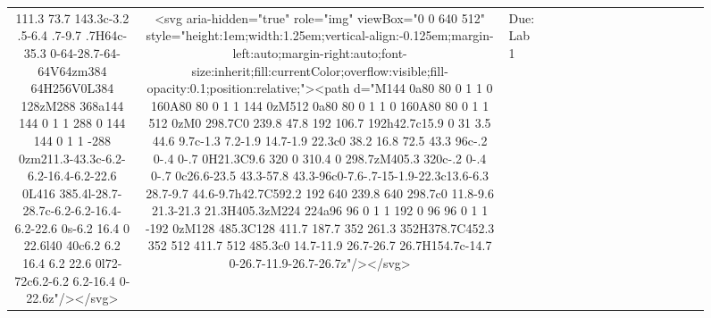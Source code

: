 \documentclass[
]{article}
\begin{document}
\begin{figure*}
\begin{longtable*}{cclllccccccccccl}
111.3 73.7 143.3c-3.2 .5-6.4 .7-9.7 .7H64c-35.3 0-64-28.7-64-64V64zm384 64H256V0L384 128zM288 368a144 144 0 1 1 288 0 144 144 0 1 1 -288 0zm211.3-43.3c-6.2-6.2-16.4-6.2-22.6 0L416 385.4l-28.7-28.7c-6.2-6.2-16.4-6.2-22.6 0s-6.2 16.4 0 22.6l40 40c6.2 6.2 16.4 6.2 22.6 0l72-72c6.2-6.2 6.2-16.4 0-22.6z"/></svg> & <svg aria-hidden="true" role="img" viewBox="0 0 640 512" style="height:1em;width:1.25em;vertical-align:-0.125em;margin-left:auto;margin-right:auto;font-size:inherit;fill:currentColor;overflow:visible;fill-opacity:0.1;position:relative;"><path d="M144 0a80 80 0 1 1 0 160A80 80 0 1 1 144 0zM512 0a80 80 0 1 1 0 160A80 80 0 1 1 512 0zM0 298.7C0 239.8 47.8 192 106.7 192h42.7c15.9 0 31 3.5 44.6 9.7c-1.3 7.2-1.9 14.7-1.9 22.3c0 38.2 16.8 72.5 43.3 96c-.2 0-.4 0-.7 0H21.3C9.6 320 0 310.4 0 298.7zM405.3 320c-.2 0-.4 0-.7 0c26.6-23.5 43.3-57.8 43.3-96c0-7.6-.7-15-1.9-22.3c13.6-6.3 28.7-9.7 44.6-9.7h42.7C592.2 192 640 239.8 640 298.7c0 11.8-9.6 21.3-21.3 21.3H405.3zM224 224a96 96 0 1 1 192 0 96 96 0 1 1 -192 0zM128 485.3C128 411.7 187.7 352 261.3 352H378.7C452.3 352 512 411.7 512 485.3c0 14.7-11.9 26.7-26.7 26.7H154.7c-14.7 0-26.7-11.9-26.7-26.7z"/></svg> & Due: Lab 1 \\ 

\end{longtable*}
\end{figure*}
\end{document}
